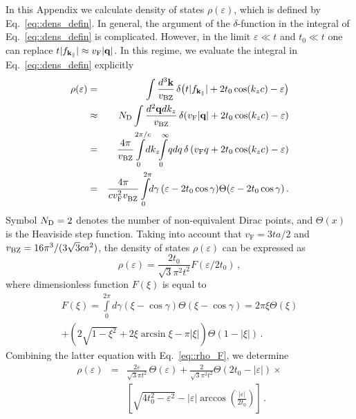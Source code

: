 \documentclass[prb,twocolumn,showpacs,aps,superscriptaddress,floatfix]{revtex4}
\begin{document}
In this Appendix we calculate density of states
$\rho(\varepsilon )$,
which is defined by
Eq.~\eqref{eq::dens_defin}.
In general, the argument of the $\delta$-function in the integral of
Eq.~\eqref{eq::dens_defin}
is complicated. However, in the limit
$\varepsilon\ll t$
and
$t_0\ll t$
one can replace
$t|f_{\mathbf{k}_{\|}}|\approx v_{\rm F}|\mathbf{q}|$.
In this regime, we evaluate the integral in
Eq.~\eqref{eq::dens_defin}
explicitly
\begin{eqnarray}
\rho(\varepsilon)
&=&
\int\frac{d^3\mathbf{k}}{v_{\rm BZ}}\,
	\delta\!\left(
			t|f_{\mathbf{k}_{\|}}|
			+
			2t_0 \cos (k_zc)
			-
			\varepsilon
		\right)
\\
&\approx&
N_{\rm D}\int\frac{d^2\mathbf{q}dk_z}{v_{\rm BZ}}\,
	\delta\!\left(
			v_{\rm F}|\textbf{q}|
			+
			2t_0\cos(k_z c)
			-
			\varepsilon
			\right)
\nonumber
\\
&=&
\frac{4\pi}{v_{\rm BZ}}\!\!
\int\limits_{0}^{2\pi /c}\!\!\!dk_z\!\!
	\int\limits_{0}^{\infty}\!qdq\,
		\delta\left(v_{\rm F}q+2t_0\cos(k_z c)-\varepsilon\right)
\nonumber\\
&=&
\frac{4\pi}{c v_{\rm F}^2v_{\rm BZ}^{\vphantom{2}}}
\int\limits_{0}^{2\pi }\!\!d\gamma\,
	(\varepsilon-2t_0\cos\gamma)
	\Theta(\varepsilon-2t_0\cos\gamma)\,.
\nonumber
\end{eqnarray}
Symbol
$N_{\rm D}=2$
denotes the number of non-equivalent Dirac points, and
$\Theta(x)$
is the Heaviside step function. Taking into account that
$v_{\text{F}}=3ta/2$
and
$v_{\rm BZ}=16\pi^3/(3\sqrt{3}ca^2)$,
the density of states
$\rho(\varepsilon)$
can be expressed as
\begin{equation}\label{eq::rho_F}
\rho(\varepsilon)=\frac{2t_0}{\sqrt{3}\pi^2t^2}F(\varepsilon/2t_0)\,,
\end{equation}
where dimensionless function
$F(\xi)$
is equal to
\begin{eqnarray}
F(\xi)
=
\int\limits_{0}^{2\pi}\!\!
	d\gamma(\xi-\cos\gamma)\Theta(\xi-\cos\gamma)
=
2\pi\xi\Theta(\xi)
\nonumber
\\
+\left(2\sqrt{1-\xi^2}+2\xi \arcsin \xi-\pi|\xi|\right)\Theta(1-|\xi|)\,.
\end{eqnarray}
Combining the latter equation with
Eq.~\eqref{eq::rho_F},
we determine
\begin{eqnarray}
\rho(\varepsilon)
&=&
\frac{2\varepsilon}{\sqrt{3}\pi t^2}\,\Theta(\varepsilon)+
\frac{2}{\sqrt{3}\pi^2t^2}\Theta\left(2t_0-|\varepsilon| \right)\times\nonumber\\
&&\left[\sqrt{4t_0^{2}-\varepsilon^2}-|\varepsilon| \arccos \left(\frac{|\varepsilon|}{2t_0}\right)\right]\,.\label{eq::DOSappr}
\end{eqnarray}
\end{document}

